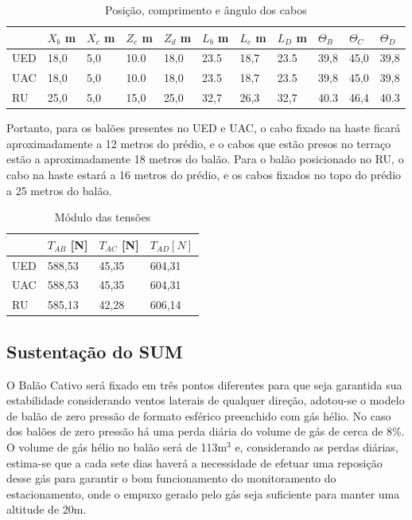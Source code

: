 \begin{table}[H]
\centering
\begin{tabular}{l|l|l|l|l|l|l|l|l|l|l|}
\cline{2-11}
 & $X_{b}$ m & $X_{c}$ m & $Z_{c}$ m & $Z_{d}$ m & $L_{b}$ m & $L_{c}$ m & $L_{D}$ m & $\Theta _{B}$ & $\Theta _{C}$ & $\Theta _{D}$ \\ \hline
\multicolumn{1}{|l|}{UED} & 18,0 & 5,0 & 10.0 & 18,0 & 23.5 & 18,7 & 23.5 & 39,8 & 45,0 & 39,8 \\ \hline
\multicolumn{1}{|l|}{UAC} & 18,0 & 5,0 & 10.0 & 18,0 & 23.5 & 18,7 & 23.5 & 39,8 & 45,0 & 39,8 \\ \hline
\multicolumn{1}{|l|}{RU} & 25,0 & 5,0 & 15,0 & 25,0 & 32,7 & 26,3 & 32,7 & 40.3 & 46,4 & 40.3 \\ \hline
\end{tabular}
\caption{Posição, comprimento e ângulo dos cabos}
\label{tab:composangcabos}
\end{table}

Portanto, para os balões presentes no UED e UAC, o cabo fixado na haste ficará aproximadamente a 12 metros do prédio, e o cabos que estão presos no terraço estão a aproximadamente 18 metros do balão. Para o balão posicionado no RU, o cabo na haste estará a 16 metros do prédio, e os cabos fixados no topo do prédio a 25 metros do balão.

\begin{table}[H]
\centering
\begin{tabular}{l|l|l|l|}
\cline{2-4}
 & $T_{AB}$ [N] & $T_{AC}$ [N] & $T_{AD} [N]$ \\ \hline
\multicolumn{1}{|l|}{UED} & 588,53 & 45,35 & 604,31 \\ \hline
\multicolumn{1}{|l|}{UAC} & 588,53 & 45,35 & 604,31 \\ \hline
\multicolumn{1}{|l|}{RU} & 585,13 & 42,28 & 606,14 \\ \hline
\end{tabular}
\caption{ Módulo das tensões}
\label{table:modTensoes}
\end{table}

\subsection{Sustentação do SUM}

O Balão Cativo será fixado em três pontos diferentes para que seja garantida sua estabilidade considerando ventos laterais de qualquer direção, adotou-se o modelo de balão de zero pressão de formato esférico preenchido com gás hélio. No caso dos balões de zero pressão há uma perda diária do volume de gás de cerca de 8\%. O volume de gás hélio no balão será de 113m$^{3}$ e, considerando as perdas diárias, estima-se que a cada sete dias haverá a necessidade de  efetuar uma reposição desse gás para garantir o bom funcionamento do monitoramento do estacionamento, onde o empuxo gerado pelo gás seja suficiente para manter uma altitude de 20m.

